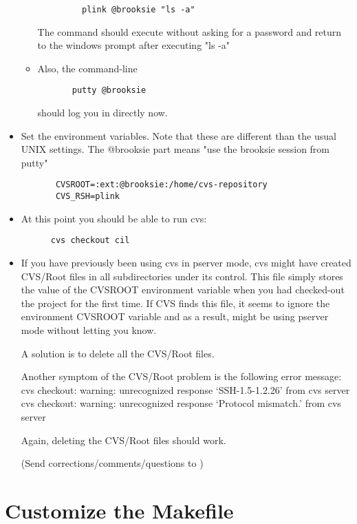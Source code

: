 \documentclass{book}
\begin{document}
\begin{itemize}
\begin{itemize}
\begin{verbatim}
	     plink @brooksie "ls -a"
\end{verbatim}

     The command should execute without asking for a password and return to the 
     windows prompt after executing "ls -a"

   \item Also, the command-line
\begin{verbatim}
	   putty @brooksie
\end{verbatim}
     should log you in directly now.
  \end{itemize}

\item Set the environment variables. Note that these are different than the
usual UNIX settings. The @brooksie part means "use the brooksie session from
putty"

\begin{verbatim}
       CVSROOT=:ext:@brooksie:/home/cvs-repository
       CVS_RSH=plink
\end{verbatim}

\item At this point you should be able to run cvs:

\begin{verbatim}
      cvs checkout cil
\end{verbatim}

\item If you have previously been using cvs in pserver mode, cvs might have
created CVS/Root files in all subdirectories under its control. This file
simply stores the value of the CVSROOT environment variable when you had
checked-out the project for the first time. If CVS finds this file, it seems
to ignore the environment CVSROOT variable and as a result, might be using
pserver mode without letting you know.
   
   A solution is to delete all the CVS/Root files.

   Another symptom of the CVS/Root problem is the following error message:
   cvs checkout: warning: unrecognized response `SSH-1.5-1.2.26' from cvs server
   cvs checkout: warning: unrecognized response `Protocol mismatch.' from cvs	
   server

   Again, deleting the CVS/Root files should work.


(Send corrections/comments/questions to )
\end{itemize}


\section{Customize the Makefile}
\end{document}
